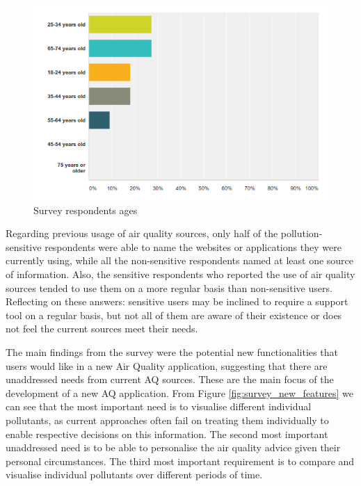 \begin{figure}[H]
\begin{adjustbox}{width=1\textwidth,center=\textwidth}
  \centering
  \includegraphics[scale=1]{images/ages_survey.png}
\end{adjustbox}
  \caption[Survey respondents ages ]{Survey respondents ages}
  \label{fig:survey_ages}
\end{figure}

Regarding previous usage of air quality sources, only half of the pollution-sensitive respondents were able to name the websites or applications they were currently using, while all the non-sensitive respondents named at least one source of information. Also, the sensitive respondents who reported the use of air quality sources tended to use them on a more regular basis than non-sensitive users. Reflecting on these answers: sensitive users may be inclined to require a support tool on a regular basis, but not all of them are aware of their existence or does not feel the current sources meet their needs.

The main findings from the survey were the potential new functionalities that users would like in a new Air Quality application, suggesting that there are unaddressed needs from current AQ sources. These are the main focus of the development of a new AQ application. From Figure \ref{fig:survey_new_features} we can see that the most important need is to visualise different individual pollutants, as current approaches often fail on treating them individually to enable respective decisions on this information. The second most important unaddressed need is to be able to personalise the air quality advice given their personal circumstances. The third most important requirement is to compare and visualise individual pollutants over different periods of time. 

